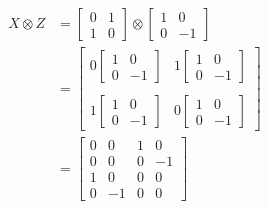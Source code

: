\begin{align*}
	X \otimes Z &= \begin{bmatrix}
		0 & 1 \\
		1 & 0
	\end{bmatrix}
	\otimes
	\begin{bmatrix}
		1 & 0 \\
		0 & -1
	\end{bmatrix} \\
	&= \begin{bmatrix}
		0\begin{bmatrix}
			1 & 0 \\
			0 & -1
			\end{bmatrix}
		&
		1\begin{bmatrix}
			1 & 0 \\
			0 & -1
			\end{bmatrix}
		\\ \\
		1\begin{bmatrix}
			1 & 0 \\
			0 & -1
			\end{bmatrix}
		&
		0\begin{bmatrix}
			1 & 0 \\
			0 & -1
			\end{bmatrix}
	\end{bmatrix} \\
	&= \begin{bmatrix}
		0 & 0 & 1 & 0 \\
		0 & 0 & 0 & -1 \\
		1 & 0 & 0 & 0 \\
		0 & -1 & 0 & 0
	\end{bmatrix}
\end{align*}
